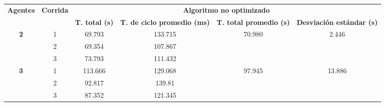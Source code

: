 \begin{table}[H]
	\centering
	\resizebox{\textwidth}{!} {
	\begin{tabular}{|c|c|llcc|}
		\hline
		\multirow{2}{*}{\textbf{Agentes}} & \multirow{2}{*}{\textbf{Corrida}} & \multicolumn{4}{c|}{\textbf{Algoritmo no optimizado}}                                                                                                                                                     \\ \cline{3-6} 
		&                                   & \multicolumn{1}{c|}{\textbf{T. total (s)}} & \multicolumn{1}{c|}{\textbf{T. de ciclo promedio (ms)}} & \multicolumn{1}{c|}{\textbf{T. total promedio (s)}} & \textbf{Desviación estándar (s)} \\ \hline
		\multirow{3}{*}{\textbf{2}}       & 1                                 & \multicolumn{1}{c|}{69.793}                    & \multicolumn{1}{c|}{133.715}                                & \multicolumn{1}{c|}{\multirow{3}{*}{70.980}}            & \multirow{3}{*}{2.446}           \\ \cline{2-4}
		& 2                                 & \multicolumn{1}{c|}{69.354}                    & \multicolumn{1}{c|}{107.867}                                & \multicolumn{1}{c|}{}                                   &                                  \\ \cline{2-4}
		& 3                                 & \multicolumn{1}{c|}{73.793}                    & \multicolumn{1}{c|}{111.432}                                & \multicolumn{1}{c|}{}                                   &                                  \\ \hline
		\multirow{3}{*}{\textbf{3}}       & 1                                 & \multicolumn{1}{c|}{113.666}                   & \multicolumn{1}{c|}{129.068}                                & \multicolumn{1}{c|}{\multirow{3}{*}{97.945}}            & \multirow{3}{*}{13.886}          \\ \cline{2-4}
		& 2                                 & \multicolumn{1}{c|}{92.817}                    & \multicolumn{1}{c|}{139.81}                                 & \multicolumn{1}{c|}{}                                   &                                  \\ \cline{2-4}
		& 3                                 & \multicolumn{1}{c|}{87.352}                    & \multicolumn{1}{c|}{121.345}                                & \multicolumn{1}{c|}{}                                   &                                  \\ \hline

\end{tabular}}
\end{table}
